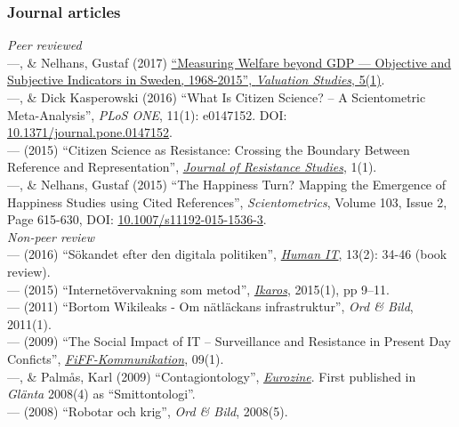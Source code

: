 \documentclass[a4paper,11pt,oneside]{article}
\begin{document}
\subsubsection{Journal articles}
  \noindent  \emph{Peer reviewed} \\
  ---, \& Nelhans, Gustaf (2017) \href{https://dx.doi.org/10.3384/VS.2001-5992.17517}{``Measuring Welfare beyond GDP --- Objective and Subjective Indicators in Sweden, 1968-2015'', \emph{Valuation Studies}, 5(1)}.\\
  ---, \& Dick Kasperowski (2016) ``What Is Citizen Science? – A Scientometric Meta-Analysis'', \emph{PLoS ONE}, 11(1): e0147152. DOI: \href{http://dx.doi.org/10.1371/journal.pone.0147152}{10.1371/journal.pone.0147152}.\\
  --- (2015) ``Citizen Science as Resistance: Crossing the Boundary Between Reference and Representation'', \href{https://gup.ub.gu.se/publication/218601-citizen-science-as-resistance-crossing-the-boundary-between-reference-and-representation}{\emph{Journal of Resistance Studies}}, 1(1).\\
  ---, \& Nelhans, Gustaf (2015) ``The Happiness Turn? Mapping the Emergence of Happiness Studies using Cited References'', \emph{Scientometrics}, Volume 103, Issue 2, Page 615-630, DOI: \href{http://dx.doi.org/10.1007/s11192-015-1536-3}{10.1007/s11192-015-1536-3}.\\

  \noindent  \emph{Non-peer review} \\
    --- (2016) ``Sökandet efter den digitala politiken'', \href{https://humanit.hb.se/article/view/504/572}{\emph{Human IT}}, 13(2): 34-46 (book review).\\
    --- (2015) ``Internetövervakning som metod'', \href{http://gup.ub.gu.se/records/fulltext/220443/220443.pdf}{\emph{Ikaros}}, 2015(1), pp 9–11.\\
    --- (2011) ``Bortom Wikileaks - Om nätläckans infrastruktur'', \emph{Ord \& Bild}, 2011(1).\\
    --- (2009) ``The Social Impact of IT – Surveillance and Resistance in Present Day Conficts'', \href{http://www.fiff.de/publikationen/fiff-kommunikation/fk-2009/fiff-ko-1-2009/fiko_1_2009_kullenberg.pdf}{\emph{FiFF-Kommunikation}}, 09(1).\\
    ---, \& Palmås, Karl (2009) ``Contagiontology'', \href{http://www.eurozine.com/articles/2009-03-09-kullenberg-en.html}{\emph{Eurozine}}. First published in \emph{Glänta} 2008(4) as ``Smittontologi''.\\
    --- (2008) ``Robotar och krig'', \emph{Ord \& Bild}, 2008(5).\\
\end{document}
